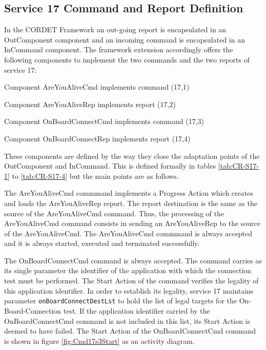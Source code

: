 \documentclass[a4paper,10pt]{article}
\newenvironment{fw_itemize}						%
{\begin{itemize}
  \setlength{\itemsep}{1mm}
  \setlength{\parskip}{0pt}
  \setlength{\parsep}{0pt}}
{\end{itemize}}
\begin{document}
\subsection{Service 17 Command and Report Definition}
In the CORDET Framework an out-going report is encapsulated in an OutComponent component and an incoming command is encapsulated in an InCommand component. The framework extension accordingly offers the following components to implement the two commands and the two reports of service 17:

\begin{fw_itemize}
\item Component AreYouAliveCmd implements command (17,1) 
\item Component AreYouAliveRep implements report (17,2) 
\item Component OnBoardConnectCmd implements command (17,3)  
\item Component OnBoardConnectRep implements report (17,4) 
\end{fw_itemize}

These components are defined by the way they close the adaptation points of the OutComponent and InCommand. This is defined formally in tables \ref{tab:CR-S17-1} to \ref{tab:CR-S17-4} but the main points are as follows.

The AreYouAliveCmd commmand implements a Progress Action which creates and loads the AreYouAliveRep report. The report destination is the same as the source of the AreYouAliveCmd command. Thus, the processing of the AreYouAliveCmd command consists in sending an AreYouAliveRep to the source of the AreYouAliveCmd. The AreYouAliveCmd commmand is always accepted and it is always started, executed and terminated successfully.

The OnBoardConnectCmd command is always accepted. The command carries as its single parameter the identifier of the application with which the connection test must be performed. The Start Action of the command verifies the legality of this application identifier. In order to establish its legality, service 17 maintains parameter \texttt{onBoardConnectDestLst} to hold the list of legal targets for the On-Board-Connection test. If the application identifier carried by the OnBoardConnectCmd command is not included in this list, its Start Action is deemed to have failed. The Start Action of the OnBoardConnectCmd command is shown in figure \ref{fig:Cmd17s3Start} as an activity diagram.
\end{document}
